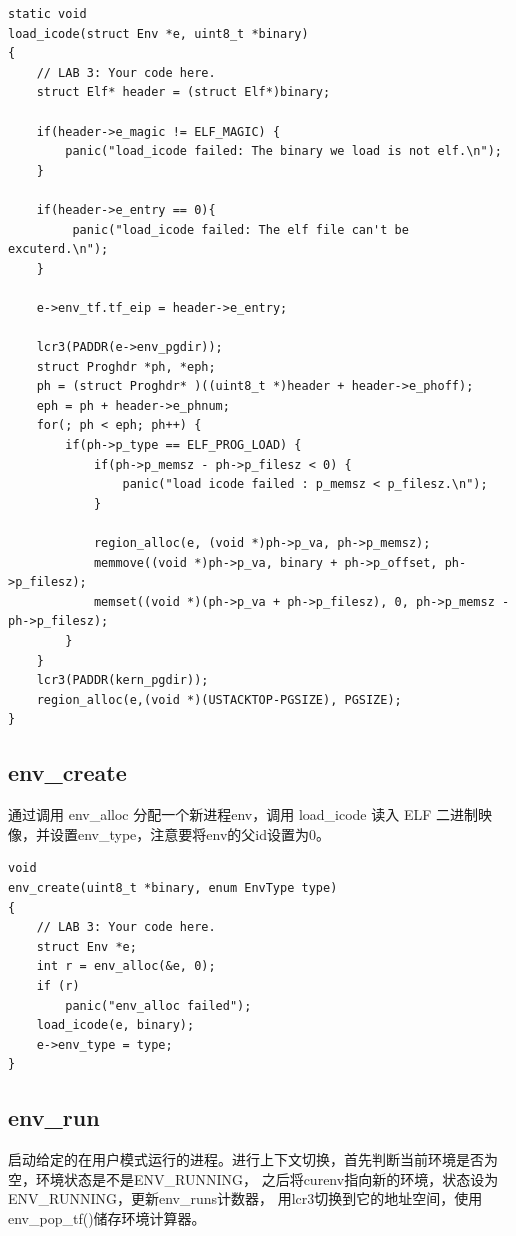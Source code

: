\documentclass[12pt,a4paper,UTF8]{article}
\begin{document}
    \begin{lstlisting}[style=CPP]
static void
load_icode(struct Env *e, uint8_t *binary)
{
    // LAB 3: Your code here.
    struct Elf* header = (struct Elf*)binary;
        
    if(header->e_magic != ELF_MAGIC) {
        panic("load_icode failed: The binary we load is not elf.\n");
    }
    
    if(header->e_entry == 0){
         panic("load_icode failed: The elf file can't be excuterd.\n");
    }
    
    e->env_tf.tf_eip = header->e_entry;
    
    lcr3(PADDR(e->env_pgdir));   
    struct Proghdr *ph, *eph;
    ph = (struct Proghdr* )((uint8_t *)header + header->e_phoff);
    eph = ph + header->e_phnum;
    for(; ph < eph; ph++) {
        if(ph->p_type == ELF_PROG_LOAD) {
            if(ph->p_memsz - ph->p_filesz < 0) {
                panic("load icode failed : p_memsz < p_filesz.\n");
            }
    
            region_alloc(e, (void *)ph->p_va, ph->p_memsz);
            memmove((void *)ph->p_va, binary + ph->p_offset, ph->p_filesz);
            memset((void *)(ph->p_va + ph->p_filesz), 0, ph->p_memsz - ph->p_filesz);
        }
    } 
    lcr3(PADDR(kern_pgdir));
    region_alloc(e,(void *)(USTACKTOP-PGSIZE), PGSIZE);
}
    \end{lstlisting}

    \subsection{env\_create}

    通过调用 env\_alloc 分配一个新进程env，调用 load\_icode 读入 ELF 二进制映像，并设置env\_type，注意要将env的父id设置为0。

    \begin{lstlisting}[style=CPP]
void
env_create(uint8_t *binary, enum EnvType type)
{
    // LAB 3: Your code here.
    struct Env *e;
    int r = env_alloc(&e, 0);
    if (r)
        panic("env_alloc failed");
    load_icode(e, binary);
    e->env_type = type;
}
    \end{lstlisting}

    \subsection{env\_run}

    启动给定的在用户模式运行的进程。进行上下文切换，首先判断当前环境是否为空，环境状态是不是ENV\_RUNNING，
    之后将curenv指向新的环境，状态设为ENV\_RUNNING，更新env\_runs计数器，
    用lcr3切换到它的地址空间，使用env\_pop\_tf()储存环境计算器。
\end{document}
